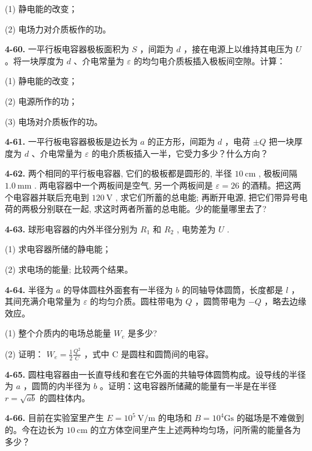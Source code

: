 (1) 静电能的改变；

(2) 电场力对介质板作的功。

\vfill\newpage

\textbf{4-60.} 一平行板电容器极板面积为 $S$ ，间距为 $d$ ，接在电源上以维持其电压为 $U$ 。将一块厚度为 $d$ 、介电常量为 $\varepsilon$ 的均匀电介质板插入极板间空隙。计算：

(1) 静电能的改变；

(2) 电源所作的功；

(3) 电场对介质板作的功。

\vfill


\textbf{4-61.} 一平行板电容器极板是边长为 $a$ 的正方形，间距为 $d$ ，电荷 $\pm Q$ 把一块厚度为 $d$ 、介电常量为 $\varepsilon$ 的电介质板插入一半，它受力多少？什么方向？

\vfill\newpage

\textbf{4-62.} 两个相同的平行板电容器, 它们的极板都是圆形的, 半径 $10 \mathrm{~cm}$ , 极板间隔 $1.0 \mathrm{~mm}$ . 两电容器中一个两板间是空气, 另一个两板间是 $\varepsilon = 26$ 的酒精。把这两个电容器并联后充电到 $120 \mathrm{~V}$ , 求它们所蓄的总电能; 再断开电源, 把它们带异号电荷的两极分别联在一起, 求这时两者所蓄的总电能。少的能量哪里去了?

\vfill


\textbf{4-63.} 球形电容器的内外半径分别为 $R_{1}$ 和 $R_{2}$ , 电势差为 $U$ .

(1) 求电容器所储的静电能；

(2) 求电场的能量; 比较两个结果。

\vfill\newpage

\textbf{4-64.} 半径为 $a$ 的导体圆柱外面套有一半径为 $b$ 的同轴导体圆筒，长度都是 $l$ ，其间充满介电常量为 $\varepsilon$ 的均匀介质。圆柱带电为 $Q$ ，圆筒带电为 $-Q$ ，略去边缘效应。

(1) 整个介质内的电场总能量 $W_{e}$ 是多少?

(2) 证明： $W_{e}=\frac{1}{2}\frac{Q^{2}}{C}$ ，式中 C 是圆柱和圆筒间的电容。

\vfill


\textbf{4-65.} 圆柱电容器由一长直导线和套在它外面的共轴导体圆筒构成。设导线的半径为 $a$ ，圆筒的内半径为 $b$ 。证明：这电容器所储藏的能量有一半是在半径 $r = \sqrt{ab}$ 的圆柱体内。

\vfill\newpage

\textbf{4-66.} 目前在实验室里产生 $E = 10^{5} \mathrm{~V} / \mathrm{m}$ 的电场和 $B = 10^{4} \mathrm{Gs}$ 的磁场是不难做到的。今在边长为 $10 \mathrm{~cm}$ 的立方体空间里产生上述两种均匀场，问所需的能量各为多少？


